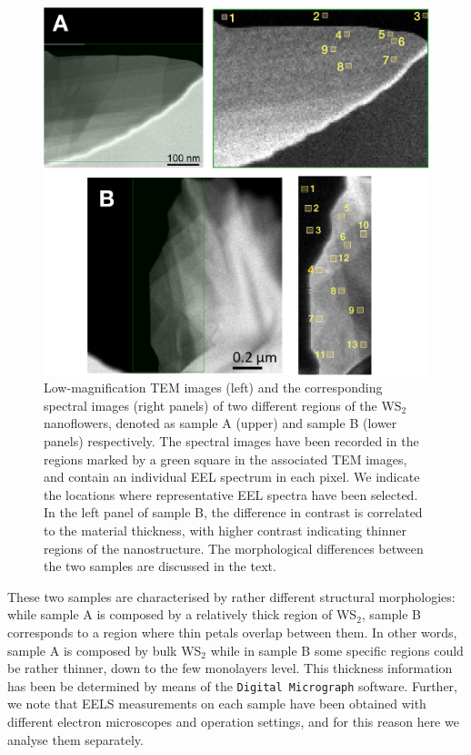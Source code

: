 \begin{figure}[t]
\begin{centering}
  \includegraphics[width=0.92\linewidth]{plots/Spectra_location.pdf}
  \caption{Low-magnification TEM images (left) and the corresponding
    spectral images (right panels) of two different regions of
    the WS$_2$ nanoflowers, denoted as sample A (upper) and sample B (lower panels) respectively.
    The spectral images have been recorded in the regions marked by a green square
    in the associated TEM images, and contain an individual EEL spectrum in each pixel.
    We indicate the locations where representative
    EEL spectra have been selected. 
    In the left panel of sample B, the difference in contrast is correlated to the material
    thickness, with higher contrast indicating thinner regions of the nanostructure.
    The morphological differences between the two samples are discussed in the text.
  }
\label{fig:ws2positions}
\end{centering}
\end{figure}

These two samples are characterised by rather different structural morphologies: while sample A is composed
by a relatively thick region of WS$_2$, sample B corresponds to a region where thin petals
overlap between them.
%
In other words, sample A is composed by bulk WS$_2$ while in sample B some specific regions
could be rather thinner, down to the few monolayers level.
%
This thickness information has been be determined
by means of the {\tt Digital~Micrograph}  software.
%
Further, we note that EELS measurements on each sample have
been obtained with different electron microscopes and
operation settings, and for this reason here
we analyse them separately.

